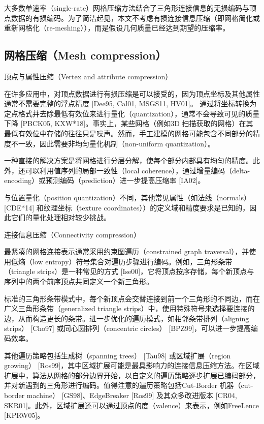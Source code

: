 大多数单速率（single-rate）网格压缩方法结合了三角形连接信息的无损编码与顶点数据的有损编码。为了简洁起见，本文不考虑有损连接信息压缩（即网格简化或重新网格化（re-meshing）），而是假设几何质量已经达到期望的压缩率。

\subsection{网格压缩（Mesh compression）}

顶点与属性压缩（Vertex and attribute compression）

在许多应用中，对顶点数据进行有损压缩是可以接受的，因为顶点坐标及其他属性通常不需要完整的浮点精度 [Dee95, Cal01, MSGS11, HV01]。 通过将坐标转换为定点格式并去除最低有效位来进行量化（quantization），通常不会导致可见的质量下降 [PBCK05, KXW*18]。事实上，某些网格（例如3D 扫描获取的网格）在其最低有效位中存储的往往只是噪声。然而，手工建模的网格可能包含不同部分的精度不一致，因此需要非均匀量化机制（non-uniform quantization）。

一种直接的解决方案是将网格进行分层分解，使每个部分内部具有均匀的精度。此外，还可以利用值序列的局部一致性（local coherence），通过增量编码（delta-encoding）或预测编码（prediction）进一步提高压缩率 [IA02]。

与位置量化（position quantization）不同，其他常见属性（如法线（normals） [CDE*14] 和纹理坐标（texture coordinates））的定义域和精度要求是已知的，因此它们的量化处理相对较少挑战。

连接信息压缩（Connectivity compression）

最紧凑的网格连接表示通常采用约束图遍历（constrained graph traversal），并使用低熵（low entropy）符号集合对遍历步骤进行编码。例如，三角形条带（triangle strips）是一种常见的方式 [Ise00]，它将顶点按序存储，每个新顶点与序列中的两个前序顶点共同定义一个新三角形。

标准的三角形条带模式中，每个新顶点会交替连接到前一个三角形的不同边，而在广义三角形条带（generalized triangle strips）中，使用特殊符号来选择要连接的边，从而构造更长的条带。进一步优化的遍历模式，如相邻条带排列（aligning strips） [Cho97] 或同心圆排列（concentric circles） [BPZ99]，可以进一步提高编码效率。

其他遍历策略包括生成树（spanning trees） [Tau98] 或区域扩展（region growing） [Ros99]，其中区域扩展可能是最具影响力的连接信息压缩方法。在区域扩展中，算法从网格的部分边界开始，以自定义的遍历策略逐步扩展已编码部分，并对新遇到的三角形进行编码。值得注意的遍历策略包括Cut-Border 机器（cut-border machine） [GS98]、EdgeBreaker [Ros99] 及其众多改进版本 [CR04, SKR01]。此外，区域扩展还可以通过顶点的度（valence）来表示，例如FreeLence [KPRW05]。


